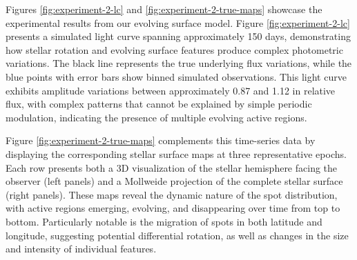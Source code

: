 \documentclass[twocolumn]{aastex631}
\begin{document}
Figures \ref{fig:experiment-2-lc} and \ref{fig:experiment-2-true-maps} showcase the experimental results from our 
evolving surface model. Figure \ref{fig:experiment-2-lc} presents a simulated light curve spanning approximately 150 days, 
demonstrating how stellar rotation and evolving surface features produce complex photometric variations. The black line 
represents the true underlying flux variations, while the blue points with error bars show binned simulated observations. 
This light curve exhibits amplitude variations between approximately 0.87 and 1.12 in relative flux, with complex patterns 
that cannot be explained by simple periodic modulation, indicating the presence of multiple evolving active regions.

Figure \ref{fig:experiment-2-true-maps} complements this time-series data by displaying the corresponding stellar 
surface maps at three representative epochs. Each row presents both a 3D visualization of the stellar hemisphere facing the 
observer (left panels) and a Mollweide projection of the complete stellar surface (right panels). 
These maps reveal the dynamic nature of the spot distribution, with active regions emerging, evolving, and disappearing over time
from top to bottom. Particularly notable is the migration of spots in both latitude and longitude, suggesting potential 
differential rotation, as well as changes in the size and intensity of individual features.
\end{document}
